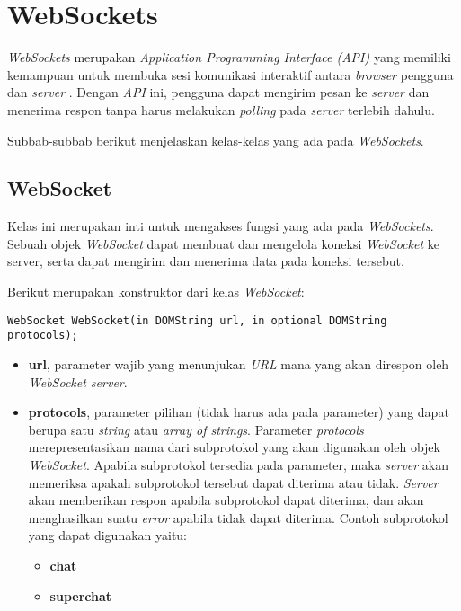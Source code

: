 \section{WebSockets}
\label{sec:WebSockets} 

\textit{WebSockets} merupakan \textit{Application Programming Interface (API)} yang memiliki kemampuan untuk membuka sesi komunikasi interaktif antara \textit{browser} pengguna dan \textit{server} \cite{websockets}. Dengan \textit{API} ini, pengguna dapat mengirim pesan ke \textit{server} dan menerima respon tanpa harus melakukan \textit{polling} pada \textit{server} terlebih dahulu.

Subbab-subbab berikut menjelaskan kelas-kelas yang ada pada \textit{WebSockets}.

\subsection{WebSocket}
Kelas ini merupakan inti untuk mengakses fungsi yang ada pada \textit{WebSockets}. Sebuah objek \textit{WebSocket} dapat membuat dan mengelola koneksi \textit{WebSocket} ke server, serta dapat mengirim dan menerima data pada koneksi tersebut. 


Berikut merupakan konstruktor dari kelas \textit{WebSocket}: 
\begin{lstlisting}
WebSocket WebSocket(in DOMString url, in optional DOMString protocols);
\end{lstlisting}

\begin{itemize}
	\item \textbf{url}, parameter wajib yang menunjukan \textit{URL} mana yang akan direspon oleh \textit{WebSocket server}.
	
	\item \textbf{protocols}, parameter pilihan (tidak harus ada pada parameter) yang dapat berupa satu \textit{string} atau \textit{array of strings}. Parameter \textit{protocols} merepresentasikan nama dari subprotokol yang akan digunakan oleh objek \textit{WebSocket}. Apabila subprotokol tersedia pada parameter, maka \textit{server} akan memeriksa apakah subprotokol tersebut dapat diterima atau tidak. \textit{Server} akan memberikan respon apabila subprotokol dapat diterima, dan akan menghasilkan suatu \textit{error} apabila tidak dapat diterima. Contoh subprotokol yang dapat digunakan yaitu:
	\begin{itemize}
		\item \textbf{chat}
		\item \textbf{superchat}
	\end{itemize}
	
\end{itemize}

